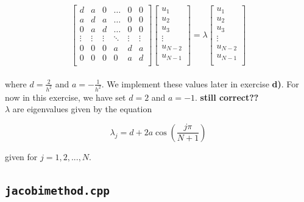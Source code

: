 \documentclass{article}
\begin{document}
  \begin{equation*} \label{eq:fullmatrixeq}
    \begin{bmatrix}
        d & a & 0 & \dots & 0 & 0 \\
        a & d & a & \dots & 0 & 0 \\
        0 & a & d & \dots & 0 & 0 \\
        \vdots & \vdots & \vdots & \ddots & \vdots & \vdots \\
        0 & 0 & 0 & a & d & a \\
        0 & 0 & 0 & 0 & a & d \\
    \end{bmatrix}
    \begin{bmatrix}
        u_1 \\
        u_2 \\
        u_3 \\
        \vdots \\
        u_{N-2} \\
        u_{N-1} \\
    \end{bmatrix}
      = \lambda
    \begin{bmatrix}
        u_1 \\
        u_2 \\
        u_3 \\
        \vdots \\
        u_{N-2} \\
        u_{N-1} \\
    \end{bmatrix}
  \end{equation*} \\

where $d = \frac{2}{h^2}$ and $a = - \frac{1}{h^2}$. We implement these values later in exercise \textbf{d)}. For now in this exercise, we have set $d = 2$ and $a = - 1$.
\textbf{still correct??} \\

$\lambda$ are eigenvalues given by the equation

\begin{equation*}
    \lambda_j = d + 2a \cos \left( \frac{j \pi }{N + 1} \right)
\end{equation*}

given for $ j = 1, 2, ..., N$.



\subsection{\texttt{jacobimethod.cpp}}
\end{document}
